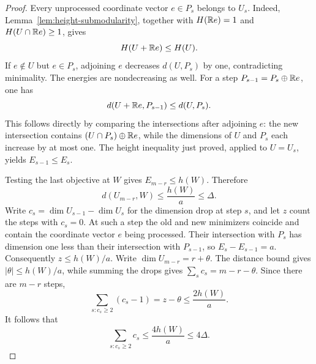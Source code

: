 \begin{proof}
Every unprocessed coordinate vector \(e\in P_s\) belongs to \(U_s\).
Indeed, Lemma~\ref{lem:height-submodularity}, together with
\(H(\mathbb R e)=1\) and \(H(U\cap\mathbb R e)\ge1\), gives
\[
 H(U+\mathbb R e)\le H(U).
\]
If \(e\notin U\) but \(e\in P_s\), adjoining \(e\) decreases
\(d(U,P_s)\) by one, contradicting minimality. The energies are
nondecreasing as well. For a step \(P_{s-1}=P_s\oplus\mathbb R e\), one has
\[
 d(U+\mathbb R e,P_{s-1})\le d(U,P_s).
\]
This follows directly by comparing the intersections after adjoining
\(e\): the new intersection contains
\((U\cap P_s)\oplus\mathbb R e\), while the dimensions of \(U\) and \(P_s\)
each increase by at most one. The height inequality just proved,
applied to \(U=U_s\), yields
\(E_{s-1}\le E_s\).

Testing the last objective at \(W\) gives \(E_{m-r}\le h(W)\). Therefore
\[
 d(U_{m-r},W)\le \frac{h(W)}a\le\Delta.
\]
Write \(c_s=\dim U_{s-1}-\dim U_s\) for the dimension drop at step \(s\),
and let \(z\) count the steps with \(c_s=0\). At such a step the old and
new minimizers coincide and contain the coordinate vector \(e\) being
processed. Their intersection with \(P_s\) has dimension one less than
their intersection with \(P_{s-1}\), so \(E_s-E_{s-1}=a\).
Consequently \(z\le h(W)/a\). Write
\(\dim U_{m-r}=r+\theta\). The distance bound gives
\(|\theta|\le h(W)/a\), while summing the drops gives
\(\sum_s c_s=m-r-\theta\). Since there are \(m-r\) steps,
\[
 \sum_{s:c_s\ge2}(c_s-1)=z-\theta\le \frac{2h(W)}a.
\]
It follows that
\begin{equation}\label{eq:multi-drop-budget}
 \sum_{s:c_s\ge2}c_s\le \frac{4h(W)}a\le4\Delta.
\end{equation}


\end{proof}
